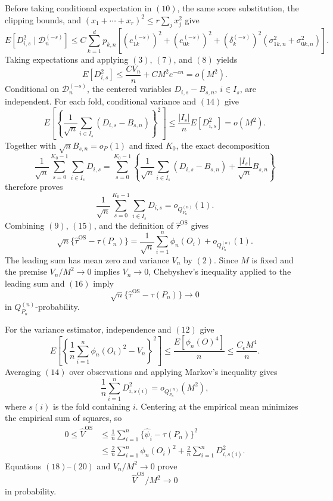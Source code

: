 Before taking conditional expectation in \((10)\), the same score
substitution, the clipping bounds, and
\((x_1+\cdots+x_r)^2\le r\sum_jx_j^2\) give
\[
 E[D_{i,s}^2\mid\mathcal D_n^{(-s)}]
 \le C\sum_{k=1}^d p_{k,n}\left[
 (e_{1k}^{(-s)})^2+(e_{0k}^{(-s)})^2
 +(\delta_k^{(-s)})^2
       (\sigma_{1k,n}^2+\sigma_{0k,n}^2)
 \right].                                                         \tag{13}
\]
Taking expectations and applying \((3)\), \((7)\), and \((8)\) yields
\[
 E[D_{i,s}^2]\le \frac{CV_n}{n}+CM^2e^{-cn}=o(M^2).                \tag{14}
\]
Conditional on \(\mathcal D_n^{(-s)}\), the centered variables
\(D_{i,s}-B_{s,n}\), \(i\in I_s\), are independent.  For each fold,
conditional variance and \((14)\) give
\[
 E\!\left[\left\{\frac1{\sqrt n}
   \sum_{i\in I_s}(D_{i,s}-B_{s,n})\right\}^2\right]
 \le \frac{|I_s|}{n}E[D_{i,s}^2]=o(M^2).
\]
Together with \(\sqrt nB_{s,n}=o_P(1)\) and fixed \(K_0\), the exact
decomposition
\[
 \frac1{\sqrt n}\sum_{s=0}^{K_0-1}\sum_{i\in I_s}D_{i,s}
 =\sum_{s=0}^{K_0-1}\left\{
   \frac1{\sqrt n}\sum_{i\in I_s}(D_{i,s}-B_{s,n})
   +\frac{|I_s|}{\sqrt n}B_{s,n}\right\}
\]
therefore proves
\[
 \frac1{\sqrt n}\sum_{s=0}^{K_0-1}\sum_{i\in I_s}D_{i,s}
 =o_{Q_{P_n}^{(n)}}(1).                                             \tag{15}
\]
Combining \((9)\), \((15)\), and the definition of
\(\widehat\tau^{\mathrm{OS}}\) gives
\[
 \sqrt n\{\widehat\tau^{\mathrm{OS}}-\tau(P_n)\}
 =\frac1{\sqrt n}\sum_{i=1}^n\phi_n(O_i)
  +o_{Q_{P_n}^{(n)}}(1).                                            \tag{16}
\]
The leading sum has mean zero and variance \(V_n\) by \((2)\).  Since
\(M\) is fixed and the premise \(V_n/M^2\to0\) implies \(V_n\to0\),
Chebyshev's inequality applied to the leading sum and \((16)\) imply
\[
 \sqrt n\{\widehat\tau^{\mathrm{OS}}-\tau(P_n)\}
 \longrightarrow0                                                  \tag{17}
\]
in \(Q_{P_n}^{(n)}\)-probability.

For the variance estimator, independence and \((12)\) give
\[
 E\!\left[\left\{\frac1n\sum_{i=1}^n\phi_n(O_i)^2-V_n\right\}^2\right]
 \le \frac{E[\phi_n(O)^4]}n
 \le \frac{C_\epsilon M^4}{n}.                                    \tag{18}
\]
Averaging \((14)\) over observations and applying Markov's inequality gives
\[
 \frac1n\sum_{i=1}^nD_{i,s(i)}^2=o_{Q_{P_n}^{(n)}}(M^2),           \tag{19}
\]
where \(s(i)\) is the fold containing \(i\).  Centering at the empirical
mean minimizes the empirical sum of squares, so
\[
 \begin{aligned}
 0\le\widehat V^{\mathrm{OS}}
 &\le\frac1n\sum_{i=1}^n\{\widehat\psi_i-\tau(P_n)\}^2\\
 &\le\frac2n\sum_{i=1}^n\phi_n(O_i)^2
     +\frac2n\sum_{i=1}^nD_{i,s(i)}^2.
 \end{aligned}                                                     \tag{20}
\]
Equations \((18)\)--\((20)\) and \(V_n/M^2\to0\) prove
\[
 \widehat V^{\mathrm{OS}}/M^2\longrightarrow0                     \tag{21}
\]
in probability.


